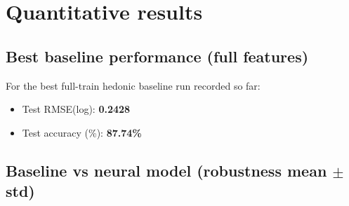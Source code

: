 \documentclass[11pt]{article}
\newcommand{\HedBestTestRmse}{0.2428}
\newcommand{\HedBestTestAcc}{87.74}
\begin{document}
\section{Quantitative results}
\subsection{Best baseline performance (full features)}
For the best full-train hedonic baseline run recorded so far:
\begin{itemize}[leftmargin=*]
  \item Test RMSE(log): \textbf{\HedBestTestRmse}
  \item Test accuracy (\%): \textbf{\HedBestTestAcc\%}
\end{itemize}

\subsection{Baseline vs neural model (robustness mean $\pm$ std)}
\end{document}
